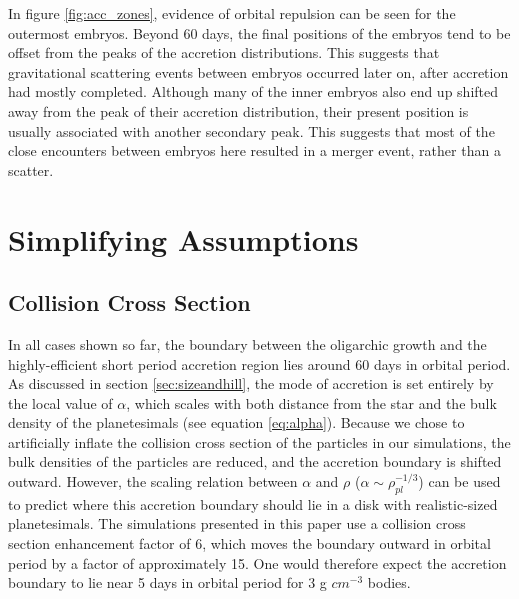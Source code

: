 \documentclass[twocolumn]{aastex63}
\begin{document}
In figure \ref{fig:acc_zones}, evidence of orbital repulsion can be seen for the outermost embryos. Beyond 60 days, the final positions of the embryos tend to be offset from the peaks of the accretion distributions. This suggests that gravitational scattering events between embryos occurred later on, after accretion had mostly completed. Although many of the inner embryos also end up shifted away from the peak of their accretion distribution, their present position is usually associated with another secondary peak. This suggests that most of the close encounters between embryos here resulted in a merger event, rather than a scatter.

\section{Simplifying Assumptions}\label{sec:assump}

\subsection{Collision Cross Section}

In all cases shown so far, the boundary between the
oligarchic growth and the highly-efficient short period accretion
region lies around 60 days in orbital period. As discussed in section \ref{sec:sizeandhill}, the mode of accretion is
set entirely by the local value of $\alpha$, which scales with both
distance from the star and the bulk density of the planetesimals (see
equation \ref{eq:alpha}). Because we chose to artificially inflate the
collision cross section of the particles in our simulations, the bulk densities
of the particles are reduced, and the accretion boundary is shifted outward.
However,  the scaling relation between $\alpha$ and $\rho$ ($\alpha \sim \rho_{pl}^{-1/3}$) can be used
to predict where this accretion boundary should lie in a disk with realistic-sized planetesimals. The simulations
presented in this paper use a collision cross section enhancement factor of 6, which moves the boundary outward in orbital
period by a factor of approximately 15. One would therefore expect the accretion boundary to lie near 5 days in orbital period
for 3 g $cm^{-3}$ bodies.
\end{document}
